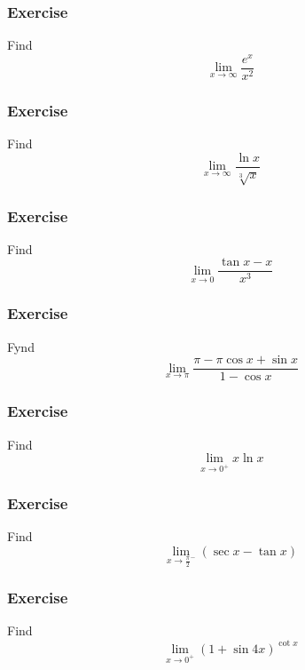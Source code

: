 \documentclass[xcolor=dvipsnames]{beamer}
\begin{document}
\begin{frame}
  \frametitle{Exercise}
{\ubung} Find
\begin{equation}
  \label{eq:awaifeif}
  \lim_{x\rightarrow\infty}\frac{e^{x}}{x^{2}}
\end{equation}
\end{frame}

\begin{frame}
  \frametitle{Exercise}
  {\ubung} Find
  \begin{equation}
    \label{eq:ijieyoja}
    \lim_{x\rightarrow\infty}\frac{\ln{}x}{\sqrt[3]{x}}
  \end{equation}
\end{frame}

\begin{frame}
  \frametitle{Exercise}
  {\ubung} Find
  \begin{equation}
    \label{eq:iemohyua}
    \lim_{x\rightarrow{}0}\frac{\tan{}x-x}{x^{3}}
  \end{equation}
\end{frame}

\begin{frame}
  \frametitle{Exercise}
  {\ubung} Fynd
  \begin{equation}
    \label{eq:eekuyuoc}
    \lim_{x\rightarrow\pi}\frac{\pi-\pi\cos{}x+\sin{}x}{1-\cos{}x}
  \end{equation}
\end{frame}

\begin{frame}
  \frametitle{Exercise}
  {\ubung} Find
  \begin{equation}
    \label{eq:zeisahda}
    \lim_{x\rightarrow{}0^{+}}x\ln{}x
  \end{equation}
\end{frame}

\begin{frame}
  \frametitle{Exercise}
  {\ubung} Find
  \begin{equation}
    \label{eq:ahgohgah}
    \lim_{x\rightarrow\frac{\pi}{2}^{-}}(\sec{}x-\tan{}x)
  \end{equation}
\end{frame}

\begin{frame}
  \frametitle{Exercise}
  {\ubung} Find
  \begin{equation}
    \label{eq:xughieta}
    \lim_{x\rightarrow{}0^{+}}(1+\sin{}4x)^{\cot{}x}
  \end{equation}
\end{frame}
\end{document}
